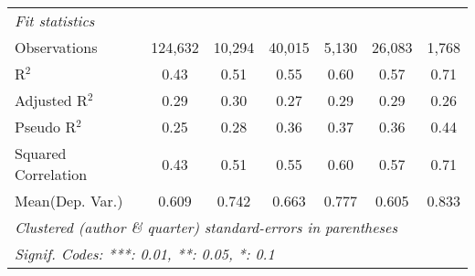 \begin{tabular}{lcccccc}
   \midrule
   \emph{Fit statistics}\\
   Observations                                               & 124,632        & 10,294      & 40,015       & 5,130   & 26,083        & 1,768\\  
   R$^2$                                                      & 0.43           & 0.51        & 0.55         & 0.60    & 0.57          & 0.71\\  
   Adjusted R$^2$                                             & 0.29           & 0.30        & 0.27         & 0.29    & 0.29          & 0.26\\  
   Pseudo R$^2$                                               & 0.25           & 0.28        & 0.36         & 0.37    & 0.36          & 0.44\\  
   Squared Correlation                                        & 0.43           & 0.51        & 0.55         & 0.60    & 0.57          & 0.71\\  
Mean(Dep. Var.) & 0.609 & 0.742 & 0.663 & 0.777 & 0.605 & 0.833 \\
   \midrule \midrule
   \multicolumn{7}{l}{\emph{Clustered (author \& quarter) standard-errors in parentheses}}\\
   \multicolumn{7}{l}{\emph{Signif. Codes: ***: 0.01, **: 0.05, *: 0.1}}\\
\end{tabular}
\par\endgroup
